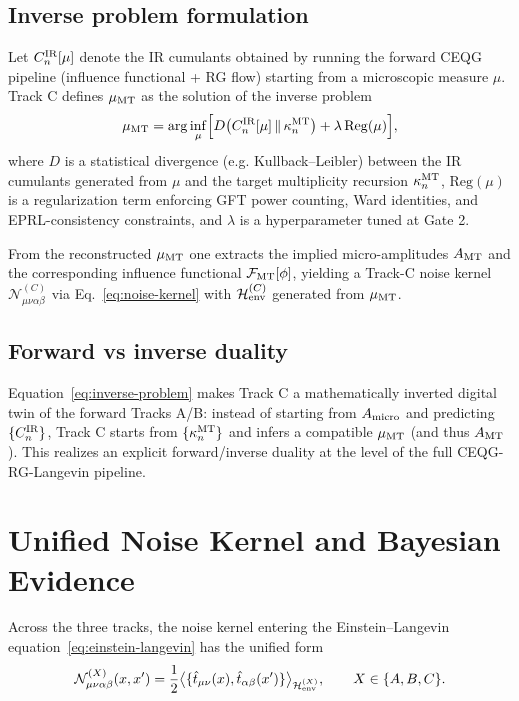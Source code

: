\documentclass[11pt]{article}
\begin{document}
\subsection{Inverse problem formulation}

Let $C_n^{\rm IR}[\mu]$ denote the IR cumulants obtained by running the forward CEQG pipeline (influence functional + RG flow) starting from a microscopic measure $\mu$. Track C defines $\mu_{\rm MT}$ as the solution of the inverse problem
\begin{equation}
  \mu_{\rm MT}
  =
  \arg\inf_{\mu}
  \Bigl[
    D\bigl(C_n^{\rm IR}[\mu] \,\Vert\, \kappa_n^{\rm MT}\bigr)
    + \lambda\,\mathrm{Reg}(\mu)
  \Bigr],
  \label{eq:inverse-problem}
\end{equation}
where $D$ is a statistical divergence (e.g. Kullback--Leibler) between the IR cumulants generated from $\mu$ and the target multiplicity recursion $\kappa_n^{\rm MT}$, $\mathrm{Reg}(\mu)$ is a regularization term enforcing GFT power counting, Ward identities, and EPRL-consistency constraints, and $\lambda$ is a hyperparameter tuned at Gate 2.

From the reconstructed $\mu_{\rm MT}$ one extracts the implied micro-amplitudes $A_{\rm MT}$ and the corresponding influence functional $\mathcal{F}_{\rm MT}[\phi]$, yielding a Track-C noise kernel $\mathcal{N}^{(C)}_{\mu\nu\alpha\beta}$ via Eq.~\eqref{eq:noise-kernel} with $\mathcal{H}_{\rm env}^{(C)}$ generated from $\mu_{\rm MT}$.

\subsection{Forward vs inverse duality}

Equation~\eqref{eq:inverse-problem} makes Track C a mathematically inverted digital twin of the forward Tracks A/B: instead of starting from $A_{\rm micro}$ and predicting $\{C_n^{\rm IR}\}$, Track C starts from $\{\kappa_n^{\rm MT}\}$ and infers a compatible $\mu_{\rm MT}$ (and thus $A_{\rm MT}$). This realizes an explicit forward/inverse duality at the level of the full CEQG-RG-Langevin pipeline.

\section{Unified Noise Kernel and Bayesian Evidence}

Across the three tracks, the noise kernel entering the Einstein--Langevin equation~\eqref{eq:einstein-langevin} has the unified form
\begin{equation}
  \mathcal{N}^{(X)}_{\mu\nu\alpha\beta}(x,x')
  =
  \frac{1}{2}
  \big\langle
    \{\hat{t}_{\mu\nu}(x), \hat{t}_{\alpha\beta}(x')\}
  \big\rangle_{\mathcal{H}_{\rm env}^{(X)}},
  \qquad X \in \{A,B,C\}.
\end{equation}
\end{document}
